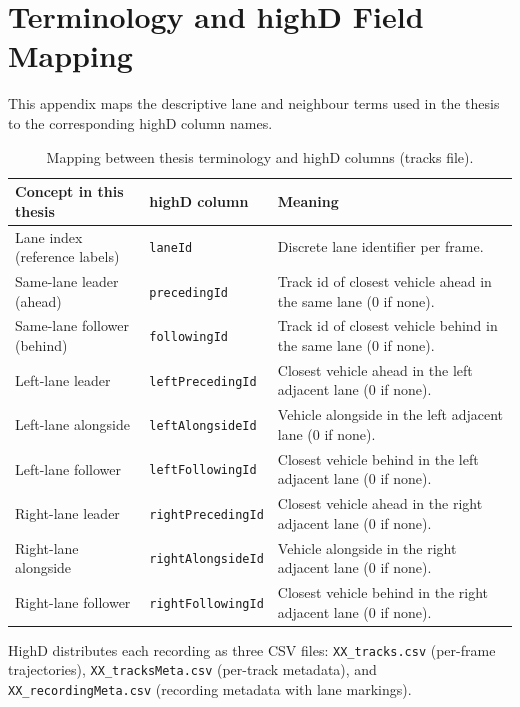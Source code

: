 \documentclass[12pt,a4paper,twoside,openright]{report}
\begin{document}
    \chapter{Terminology and highD Field Mapping}
    \label{app:field-mapping}

    This appendix maps the descriptive lane and neighbour terms used in the thesis to the corresponding highD column names.

    \begin{table}[htbp]
        \centering
        \caption{Mapping between thesis terminology and highD columns (tracks file).}
        \label{tab:field-mapping}
        {\small
        \setlength{\tabcolsep}{4pt}
            \begin{tabularx}{\textwidth}{@{}l l X@{}}
\toprule
Concept in this thesis & highD column & Meaning \\
\midrule
Lane index (reference labels) & \texttt{laneId} & Discrete lane identifier per frame. \\
Same-lane leader (ahead) & \texttt{precedingId} & Track id of closest vehicle ahead in the same lane (0 if none). \\
Same-lane follower (behind) & \texttt{followingId} & Track id of closest vehicle behind in the same lane (0 if none). \\
Left-lane leader & \texttt{leftPrecedingId} & Closest vehicle ahead in the left adjacent lane (0 if none). \\
Left-lane alongside & \texttt{leftAlongsideId} & Vehicle alongside in the left adjacent lane (0 if none). \\
Left-lane follower & \texttt{leftFollowingId} & Closest vehicle behind in the left adjacent lane (0 if none). \\
Right-lane leader & \texttt{rightPrecedingId} & Closest vehicle ahead in the right adjacent lane (0 if none). \\
Right-lane alongside & \texttt{rightAlongsideId} & Vehicle alongside in the right adjacent lane (0 if none). \\
Right-lane follower & \texttt{rightFollowingId} & Closest vehicle behind in the right adjacent lane (0 if none). \\
\bottomrule
            \end{tabularx}}
    \end{table}

    HighD distributes each recording as three CSV files: \nolinkurl{XX_tracks.csv} (per-frame trajectories), \nolinkurl{XX_tracksMeta.csv} (per-track metadata), and \nolinkurl{XX_recordingMeta.csv} (recording metadata with lane markings).
\end{document}
